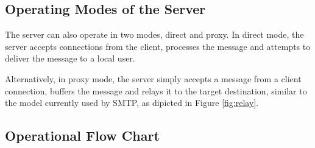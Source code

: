 \subsection{Operating Modes of the Server}

The server can also operate in two modes, direct and proxy. In direct
mode, the server accepts connections from the client, processes the
message and attempts to deliver the message to a local user.


Alternatively, in proxy mode, the server simply accepts a message from a
client connection, buffers the message and relays it to the target 
destination, similar to the model currently used by SMTP, as dipicted in
Figure \ref{fig:relay}.

\subsection{Operational Flow Chart}



